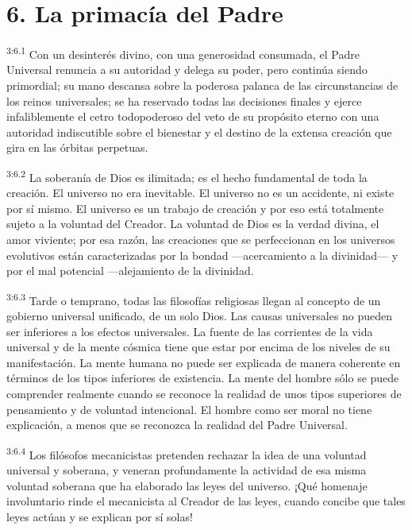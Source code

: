 \section*{6. La primacía del Padre}
\par
\textsuperscript{3:6.1} Con un desinterés divino, con una generosidad consumada, el Padre Universal renuncia a su autoridad y delega su poder, pero continúa siendo primordial; su mano descansa sobre la poderosa palanca de las circunstancias de los reinos universales; se ha reservado todas las decisiones finales y ejerce infaliblemente el cetro todopoderoso del veto de su propósito eterno con una autoridad indiscutible sobre el bienestar y el destino de la extensa creación que gira en las órbitas perpetuas.

\par
\textsuperscript{3:6.2} La soberanía de Dios es ilimitada; es el hecho fundamental de toda la creación. El universo no era inevitable. El universo no es un accidente, ni existe por sí mismo. El universo es un trabajo de creación y por eso está totalmente sujeto a la voluntad del Creador. La voluntad de Dios es la verdad divina, el amor viviente; por esa razón, las creaciones que se perfeccionan en los universos evolutivos están caracterizadas por la bondad ---acercamiento a la divinidad--- y por el mal potencial ---alejamiento de la divinidad.

\par
\textsuperscript{3:6.3} Tarde o temprano, todas las filosofías religiosas llegan al concepto de un gobierno universal unificado, de un solo Dios. Las causas universales no pueden ser inferiores a los efectos universales. La fuente de las corrientes de la vida universal y de la mente cósmica tiene que estar por encima de los niveles de su manifestación. La mente humana no puede ser explicada de manera coherente en términos de los tipos inferiores de existencia. La mente del hombre sólo se puede comprender realmente cuando se reconoce la realidad de unos tipos superiores de pensamiento y de voluntad intencional. El hombre como ser moral no tiene explicación, a menos que se reconozca la realidad del Padre Universal.

\par
\textsuperscript{3:6.4} Los filósofos mecanicistas pretenden rechazar la idea de una voluntad universal y soberana, y veneran profundamente la actividad de esa misma voluntad soberana que ha elaborado las leyes del universo. ¡Qué homenaje involuntario rinde el mecanicista al Creador de las leyes, cuando concibe que tales leyes actúan y se explican por sí solas!

